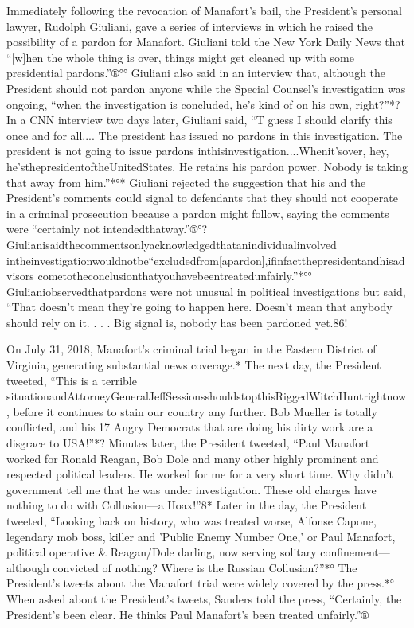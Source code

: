 Immediately following the revocation of Manafort's bail, the President's personal lawyer, Rudolph Giuliani, gave a series of interviews in which he raised the possibility of a pardon for Manafort.
Giuliani told the New York Daily News that “[w]hen the whole thing is over, things might get cleaned up with some presidential pardons.”®°°
Giuliani also said in an interview that, although the President should not pardon anyone while the Special Counsel's investigation was ongoing, “when the investigation is concluded, he's kind of on his own, right?”*?
In a CNN interview two days later, Giuliani said, “T guess I should clarify this once and for all....
The president has issued no pardons in this investigation.
The president is not going to issue pardons inthisinvestigation....Whenit'sover, hey, he'sthepresidentoftheUnitedStates.
He retains his pardon power.
Nobody is taking that away from him.”*°*
Giuliani rejected the suggestion that his and the President's comments could signal to defendants that they should not cooperate in a criminal prosecution because a pardon might follow, saying the comments were “certainly not intendedthatway.”®°? Giulianisaidthecommentsonlyacknowledgedthatanindividualinvolved intheinvestigationwouldnotbe“excludedfrom[apardon],ifinfactthepresidentandhisadvisors
cometotheconclusionthatyouhavebeentreatedunfairly.”*°°
Giulianiobservedthatpardons were not unusual in political investigations but said, “That doesn't mean they're going to happen here.
Doesn't mean that anybody should rely on it. . . .
Big signal is, nobody has been pardoned yet.86!

On July 31, 2018, Manafort's criminal trial began in the Eastern District of Virginia, generating substantial news coverage.*
The next day, the President tweeted, “This is a terrible situationandAttorneyGeneralJeffSessionsshouldstopthisRiggedWitchHuntrightnow, before it continues to stain our country any further.
Bob Mueller is totally conflicted, and his 17 Angry Democrats that are doing his dirty work are a disgrace to USA!”*?
Minutes later, the President tweeted, “Paul Manafort worked for Ronald Reagan, Bob Dole and many other highly prominent and respected political leaders.
He worked for me for a very short time.
Why didn't government tell me that he was under investigation.
These old charges have nothing to do with Collusion—a Hoax!”8*
Later in the day, the President tweeted, “Looking back on history, who was treated worse, Alfonse Capone, legendary mob boss, killer and 'Public Enemy Number One,' or Paul Manafort, political operative & Reagan/Dole darling, now serving solitary confinement—although convicted of nothing?
Where is the Russian Collusion?”*°
The President's tweets about the Manafort trial were widely covered by the press.*°
When asked about the President's tweets, Sanders told the press, “Certainly, the President's been clear.
He thinks Paul Manafort's been treated unfairly.”®%

